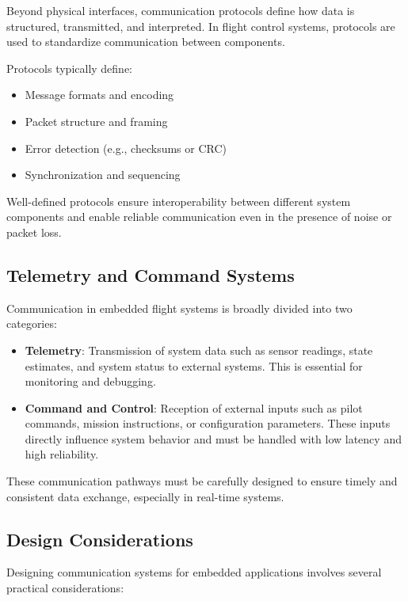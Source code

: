 Beyond physical interfaces, communication protocols define how data is structured, transmitted, and interpreted. In flight control systems, protocols are used to standardize communication between components.

Protocols typically define:
\begin{itemize}
    \item Message formats and encoding
    \item Packet structure and framing
    \item Error detection (e.g., checksums or CRC)
    \item Synchronization and sequencing
\end{itemize}

Well-defined protocols ensure interoperability between different system components and enable reliable communication even in the presence of noise or packet loss.

\subsection{Telemetry and Command Systems}

Communication in embedded flight systems is broadly divided into two categories:

\begin{itemize}
    \item \textbf{Telemetry}:  
    Transmission of system data such as sensor readings, state estimates, and system status to external systems. This is essential for monitoring and debugging.

    \item \textbf{Command and Control}:  
    Reception of external inputs such as pilot commands, mission instructions, or configuration parameters. These inputs directly influence system behavior and must be handled with low latency and high reliability.
\end{itemize}

These communication pathways must be carefully designed to ensure timely and consistent data exchange, especially in real-time systems.

\subsection{Design Considerations}

Designing communication systems for embedded applications involves several practical considerations:

